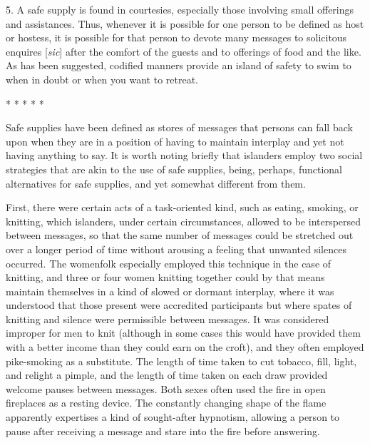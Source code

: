 \documentclass[openany,nobib]{tufte-book}
\begin{document}
5. A safe supply is found in courtesies, especially those involving
small offerings and assistances. Thus, whenever it is possible for one
person to be defined as host or hostess, it is possible for that person
to devote many messages to solicitous enquires {[}\emph{sic}{]} after the comfort of the
guests and to offerings of food and the like. As has been suggested,
codified manners provide an island of safety to swim to when in doubt or
when you want to retreat.

\vspace{.2in}
\begin{centering}

\Large{* * * * *}

\end{centering}
\vspace{.17in}

\noindent Safe supplies have been defined as stores of messages that persons can
fall back upon when they are in a position of having to maintain
interplay and yet not having anything to say. It is worth noting briefly
that islanders employ two social strategies that are akin to the use of
safe supplies, being, perhaps, functional alternatives for safe
supplies, and yet somewhat different from them.

First, there were certain acts of a task-oriented kind, such as eating,
smoking, or knitting, which islanders, under certain circumstances,
allowed to be interspersed between messages, so that the same number of
messages could be stretched out over a longer period of time without
arousing a feeling that unwanted silences occurred. The womenfolk
especially employed this technique in the case of knitting, and three or
four women knitting together could by that means maintain themselves in
a kind of slowed or dormant interplay, where it was understood that
those present were accredited participants but where spates of knitting
and silence were permissible between messages. It was considered
improper for men to knit (although in some cases this would have
provided them with a better income than they could earn on the croft),
and they often employed pike-smoking as a substitute. The length of time
taken to cut tobacco, fill, light, and relight a pimple, and the length
of time taken on each draw provided welcome pauses between messages.
Both sexes often used the fire in open fireplaces as a resting device.
The constantly changing shape of the flame apparently expertises a kind
of sought-after hypnotism, allowing a person to pause after receiving a
message and stare into the fire before answering.
\end{document}
